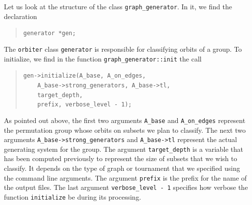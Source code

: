 Let us look at the structure of the class \verb'graph_generator'.
In it, we find the declaration 
\begin{quote}
\verb'generator *gen;'
\end{quote}
The \verb'orbiter' 
class \verb'generator' is responsible for classifying orbits of a group.
To initialize, we find in the function \verb'graph_generator::init' 
the call
\begin{quote}
\verb'gen->initialize(A_base, A_on_edges,  '\\
\verb'    A_base->strong_generators, A_base->tl, '\\
\verb'    target_depth, '\\
\verb'    prefix, verbose_level - 1);'\\
\end{quote}
As pointed out above, the first two arguments \verb'A_base' and 
\verb'A_on_edges' represent the permutation group whose orbits 
on subsets we plan to classify. 
The next two arguments \verb'A_base->strong_generators' 
and \verb'A_base->tl' represent the actual generating system 
for the group. The argument \verb'target_depth' is a variable that 
has been computed previously to represent the size of subsets that 
we wish to classify. It depends on the type of graph or tournament 
that we specified using the command line arguments.
The argument \verb'prefix' is the prefix for the name of the output files. 
The last argument \verb'verbose_level - 1' specifies how 
verbose the function \verb'initialize' be during its processing.

\bigskip

